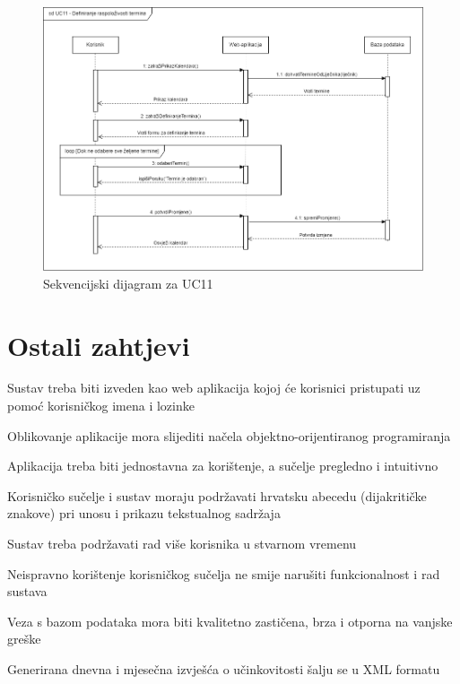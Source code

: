 				\begin{figure}[H]
			            \includegraphics[width=\textwidth]{slike/sd_uc11.png} %
			            \caption{Sekvencijski dijagram za UC11}
			            \label{fig:promjene2} %
		        \end{figure}
		        
		        \eject

		\section{Ostali zahtjevi}
			
			 \begin{packed_item}
			     \item Sustav treba biti izveden kao web aplikacija kojoj će korisnici pristupati uz pomoć korisničkog imena i lozinke
			     \item Oblikovanje aplikacije mora slijediti načela objektno-orijentiranog programiranja
			     \item Aplikacija treba biti jednostavna za korištenje, a sučelje pregledno i intuitivno
			     \item  Korisničko sučelje i sustav moraju podržavati hrvatsku abecedu (dijakritičke znakove) pri unosu i prikazu tekstualnog sadržaja
			     \item Sustav treba podržavati rad više korisnika u stvarnom vremenu
			     \item Neispravno korištenje korisničkog sučelja ne smije narušiti funkcionalnost i rad sustava
			     \item Veza s bazom podataka mora biti kvalitetno zastičena, brza i otporna na vanjske greške
			     \item Generirana dnevna i mjesečna izvješća o učinkovitosti šalju se u XML formatu
			     
			 \end{packed_item}
			 
			 
			 
	